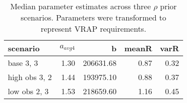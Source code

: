 \begin{table}[ht]
\centering
\caption{Median parameter estimates across three $\rho$ prior scenarios. Parameters were transformed to represent VRAP requirements.} 
\begin{tabular}{lrrrr}
  \hline
scenario & $a_{avg4}$ & b & meanR & varR \\ 
  \hline
 base 3, 3 & 1.30 & 206631.68 & 0.87 & 0.32 \\ 
  high obs 3, 2 & 1.44 & 193975.10 & 0.88 & 0.37 \\ 
  low obs 2, 3 & 1.53 & 218659.60 & 1.16 & 0.45 \\ 
   \hline
\end{tabular}
\end{table}
